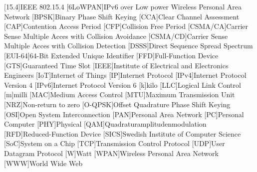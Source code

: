 \begin{acronym}[6LoWPAN]
	[15.4]{IEEE 802.15.4}
	[6LoWPAN]{IPv6 over Low power Wireless Personal Area Network}
	[BPSK]{Binary Phase Shift Keying}
	[CCA]{Clear Channel Assessment}
	[CAP]{Contention Access Period}
	[CFP]{Collision Free Period}
	[CSMA/CA]{Carrier Sense Multiple Acces with Collision Avoidance}
	[CSMA/CD]{Carrier Sense Multiple Acces with Collision Detection}
	[DSSS]{Direct Sequence Spread Spectrum}
	[EUI-64]{64-Bit Extended Unique Identifier}
	[FFD]{Full-Function Device}
	[GTS]{Guaranteed Time Slot}
	[IEEE]{Institute of Electrical and Electronics Engineers}
	[IoT]{Internet of Things}
	[IP]{Internet Protocol}
	[IPv4]{Internet Protocol Version 4}
	[IPv6]{Internet Protocol Version 6}
	{kilo}
	[LLC]{Logical Link Control}
	{milli}
	[MAC]{Medium Access Control}
	[MTU]{Maximum Transmission Unit}
	[NRZ]{Non-return to zero}
	[O-QPSK]{Offset Quadrature Phase Shift Keying}
	[OSI]{Open System Interconnection}
	[PAN]{Personal Area Network}
	[PC]{Personal Computer}
	[PHY]{Physical}
	[QAM]{Quadraturamplitudenmodulation}
	[RFD]{Reduced-Function Device}
	[SICS]{Swedish Institute of Computer Science}
	[SoC]{System on a Chip}
	[TCP]{Transmission Control Protocol}
	[UDP]{User Datagram Protocol}
	{Watt}
	[WPAN]{Wireless Personal Area Network}
	[WWW]{World Wide Web}
\end{acronym}